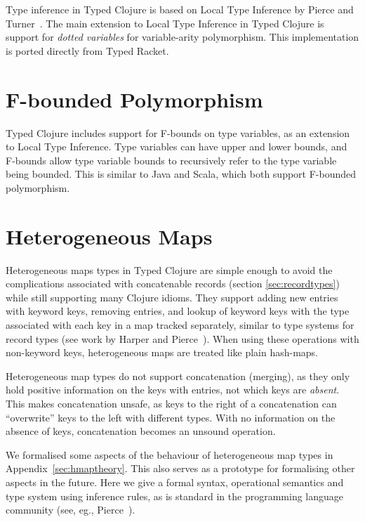 Type inference in Typed Clojure is based on Local Type Inference
by Pierce and Turner~\cite{PT00}.
The main extension to Local Type Inference in Typed Clojure
is support for \emph{dotted variables} for variable-arity polymorphism.
This implementation is ported directly from Typed Racket.

\section{F-bounded Polymorphism}

Typed Clojure includes support for F-bounds on type variables\cite{CCHOM89}, as an extension
to Local Type Inference. 
Type variables can have upper and lower bounds, and F-bounds allow type variable bounds
to recursively refer to the type variable being bounded.
This is similar to Java and Scala, which both support F-bounded polymorphism.

\section{Heterogeneous Maps}
\label{ref:designhmap}

Heterogeneous maps types in Typed Clojure are simple enough to avoid
the complications associated with concatenable records (section \ref{sec:recordtypes})
while still supporting many Clojure idioms.
They support adding new entries with keyword keys, removing entries,
and lookup of keyword keys with the type associated with each key in
a map tracked separately, similar to type systems for record types 
(see work by Harper and Pierce~\cite{HP91}).
When using these operations with non-keyword keys, heterogeneous maps
are treated like plain hash-maps.

Heterogeneous map types do not support concatenation (merging), as they
only hold positive information on the keys with entries, not
which keys are \emph{absent}.
This makes concatenation unsafe, as keys to the right of a
concatenation can ``overwrite'' keys to the left with different types. With no information
on the absence of keys, concatenation becomes an unsound operation.

We formalised some aspects of the behaviour of heterogeneous map types in Appendix~\ref{sec:hmaptheory}.
This also serves as a prototype for formalising other aspects in the future.
Here we give a formal syntax, operational semantics and type system using inference
rules, as is standard in the programming language community (see, eg., Pierce~\cite{Pie02}).

